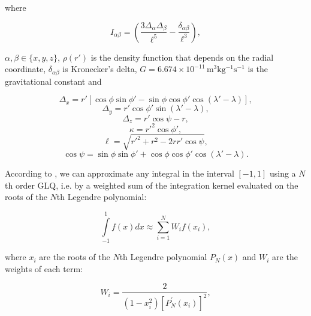\documentclass[extra]{gji}
\begin{document}
\noindent where

\begin{equation}
    I_{\alpha\beta} =
    \left(
        \frac{3\Delta_{\alpha} \Delta_{\beta}}{\ell^5} -
        \frac{\delta_{\alpha\beta}}{\ell^3}
    \right) ,
    \label{eq:tesseroid-tensor-kernel}
\end{equation}

\noindent $\alpha, \beta \in \{x, y, z\}$,
$\rho(r')$ is the density function that depends on the radial coordinate,
$\delta_{\alpha\beta}$ is Kronecker's delta,
$G = 6.674\times10^{-11}\, \text{m$^3$kg$^{-1}$s$^{-1}$}$ is the gravitational constant and

\begin{equation}
    \Delta_x = r'[\cos\phi\sin\phi' - \sin\phi\cos\phi'
               \cos(\lambda' - \lambda)],
\end{equation}
\begin{equation}
    \Delta_y = r' \cos \phi' \sin(\lambda' - \lambda),
\end{equation}
\begin{equation}
    \Delta_z = r' \cos \psi - r,
\end{equation}
\begin{equation}
    \kappa = {r'}^2 \cos \phi',
\end{equation}
\begin{equation}
    \ell = \sqrt{{r'}^2 + r^2 - 2 r r' \cos \psi},
\label{eq:ell}
\end{equation}
\begin{equation}
    \cos\psi = \sin\phi\sin\phi' + \cos\phi\cos\phi'
                 \cos(\lambda' - \lambda).
\label{eq:cospsi}
\end{equation}


According to \citet[p.~390]{Hildebrand1987}, we can approximate any integral in the interval $[-1, 1]$ using a $N$th order GLQ, i.e. by a weighted sum of the integration kernel evaluated on the roots of the $N$th Legendre polynomial:

\begin{equation}
    \int\limits_{-1}^1 f(x) dx \approx \sum_{i=1}^N W_i f(x_i),
\end{equation}

\noindent where $x_i$ are the roots of the $N$th Legendre polynomial $P_N(x)$ and $W_i$ are the weights of each term:

\begin{equation}
    W_i = \frac{2}{(1-x_i^2)[P_N^\prime(x_i)]^2},
\end{equation}
\end{document}
